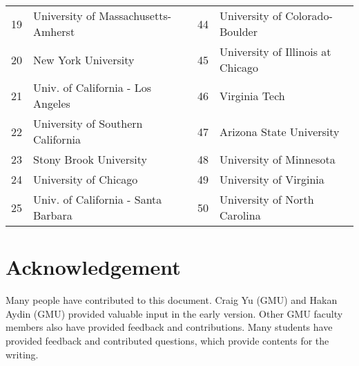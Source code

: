 \documentclass[11pt]{article}
\begin{document}
\begin{table}[h!]
\begin{tabular}{rl|rl}
    19 & University of Massachusetts-Amherst & 44&  University of Colorado-Boulder \\
    20 &  New York University  &45& University of Illinois at Chicago  \\
    21 & Univ. of California - Los Angeles &46& Virginia Tech  \\
    22 & University of Southern California &47&  Arizona State University \\
    23 & Stony Brook University &48&University of Minnesota \\
    24 & University of Chicago &49& University of Virginia \\
    25 & Univ. of California - Santa Barbara &50& University of North Carolina \\
    \bottomrule
    \end{tabular}
\end{table}

\section{Acknowledgement}

Many people have contributed to this document.
Craig Yu (GMU) and Hakan Aydin (GMU) provided valuable input in the early version. Other GMU faculty members also have provided feedback and contributions.  Many students have provided feedback and contributed questions, which provide contents for the writing.


\newpage
\end{document}
